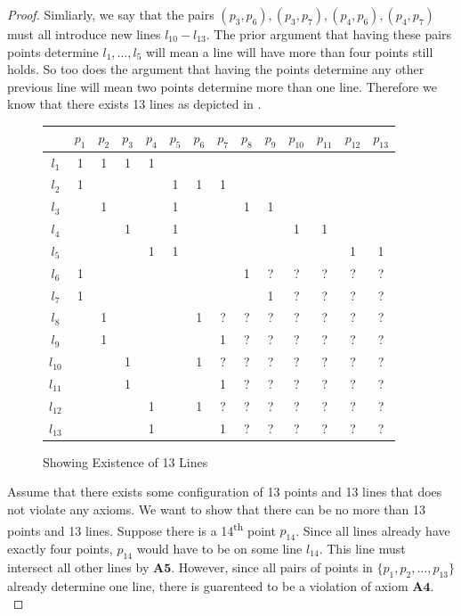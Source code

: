 \documentclass{article}
\begin{document}
\begin{proof}
Simliarly, we say that the pairs $(p_3,p_6), (p_3,p_7), (p_4, p_6), (p_4,p_7)$ must all introduce new lines $l_{10} - l_{13}$. The prior argument that having these pairs points determine $l_1, \dots, l_5$ will mean a line will have more than four points still holds. So too does the argument that having the points determine any other previous line will mean two points determine more than one line. Therefore we know that there exists 13 lines as depicted in .

\begin{figure}[h]
\caption{Showing Existence of 13 Lines}
\begin{center}
\begin{tabular}{ c|c|c|c|c|c|c|c|c|c|c|c|c|c } 
 
  & $p_1$ & $p_2$ & $p_3$ &$p_4$ &$p_5$ &$p_6$ &$p_7$ &$p_8$ &$p_9$  &$p_{10}$&$p_{11}$&$p_{12}$&$p_{13}$ \\ 
\hline
 $l_1$ & 1 & 1 & 1 & 1 &  &&& &&&&& \\ 
 \hline
 $l_2$ & 1 & &&&1&1&1&&&&&& \\
 \hline
 $l_3$ & &1&&&1&&&1&1&&&&\\
 \hline
 $l_4$ &  &  & 1 &  &1 & &&&&1&1&&\\
 \hline
 $l_5$ & &&&1&1&&&&&&&1&1\\
 \hline
 $l_6$ &1&&&&&&&1&?&?&?&?&? \\
 \hline
 $l_7$ &1&&&&&&&&1&?&?&?&?\\
 \hline
 $l_8$ &&1&&&&1&?&?&?&?&?&?&?\\
 \hline
 $l_9$ &&1&&&&&1&?&?&?&?&?&?\\
 \hline
 $l_{10}$ &&&1&&&1&?&?&?&?&?&?&?\\
 \hline
 $l_{11}$ &&&1&&&&1&?&?&?&?&?&?\\
 \hline
 $l_{12}$&&&&1&&1&?&?&?&?&?&?&?\\
 \hline
 $l_{13}$ &&&&1&&&1&?&?&?&?&?&? 

\end{tabular}
\end{center}
\end{figure}

Assume that there exists some configuration of 13 points and 13 lines that does not violate any axioms. We want to show that there can be no more than 13 points and 13 lines. Suppose there is a 14\textsuperscript{th} point $p_{14}$. Since all lines already have exactly four points, $p_{14}$ would have to be on some line $l_{14}$. This line must intersect all other lines by $\mathbf{A5}$. However, since all pairs of points in $\{p_1,p_2, \dots , p_{13}\}$ already determine one line, there is guarenteed to be a violation of axiom $\mathbf{A4}$. \\


\end{proof}
\end{document}
